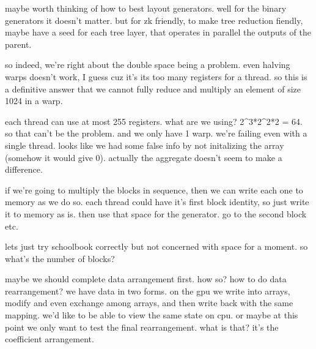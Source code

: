 maybe worth thinking of how to best layout generators. well for the binary generators it doesn't matter.
but for zk friendly, to make tree reduction fiendly, maybe have a seed for each tree layer, that operates in parallel the outputs of the parent. 


so indeed, we're right about the double space being a problem. even halving warps doesn't work, I guess cuz it's its too many registers for a thread.
so this is a definitive answer that we cannot fully reduce and multiply an element of size 1024 in a warp. 

each thread can use at most 255 registers. what are we using? 2^3*2^2*2 = 64. so that can't be the problem. and we only have 1 warp. we're failing even with a single thread. 
looks like we had some false info by not initalizing the array (somehow it would give 0).
actually the aggregate doesn't seem to make a difference. 

if we're going to multiply the blocks in sequence, then we can write each one to memory as we do so. each thread could have it's first block identity, so just write it to memory as is. then use that space for the generator. go to the second block etc.

lets just try schoolbook correctly but not concerned with space for a moment.
so what's the number of blocks? 

maybe we should complete data arrangement first.
how so?
how to do data rearrangement?
we have data in two forms.
on the gpu we write into arrays, modify and even exchange among arrays, and then write back with the same mapping. we'd like to be able to view the same state on cpu. or maybe at this point we only want to test the final rearrangement. what is that? it's the coefficient arrangement.


